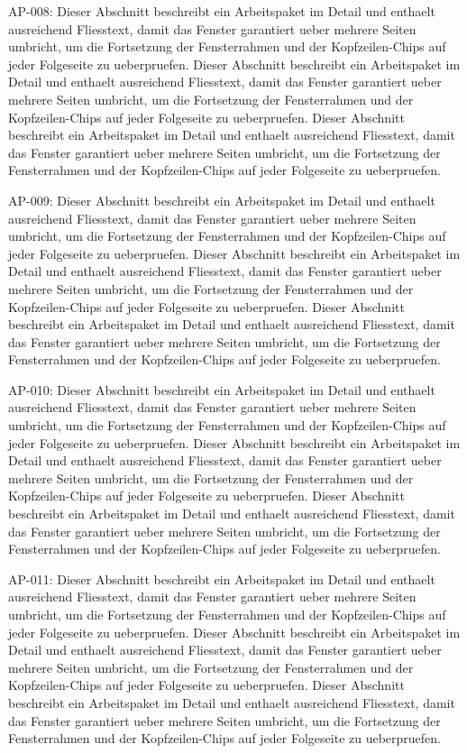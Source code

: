 \documentclass[type=report,theme=light,language=de]{semio}
\begin{document}
\begin{Table}[title=Lange Tabelle]
AP-008: Dieser Abschnitt beschreibt ein Arbeitspaket im Detail und enthaelt ausreichend Fliesstext, damit das Fenster garantiert ueber mehrere Seiten umbricht, um die Fortsetzung der Fensterrahmen und der Kopfzeilen-Chips auf jeder Folgeseite zu ueberpruefen. Dieser Abschnitt beschreibt ein Arbeitspaket im Detail und enthaelt ausreichend Fliesstext, damit das Fenster garantiert ueber mehrere Seiten umbricht, um die Fortsetzung der Fensterrahmen und der Kopfzeilen-Chips auf jeder Folgeseite zu ueberpruefen. Dieser Abschnitt beschreibt ein Arbeitspaket im Detail und enthaelt ausreichend Fliesstext, damit das Fenster garantiert ueber mehrere Seiten umbricht, um die Fortsetzung der Fensterrahmen und der Kopfzeilen-Chips auf jeder Folgeseite zu ueberpruefen. 

AP-009: Dieser Abschnitt beschreibt ein Arbeitspaket im Detail und enthaelt ausreichend Fliesstext, damit das Fenster garantiert ueber mehrere Seiten umbricht, um die Fortsetzung der Fensterrahmen und der Kopfzeilen-Chips auf jeder Folgeseite zu ueberpruefen. Dieser Abschnitt beschreibt ein Arbeitspaket im Detail und enthaelt ausreichend Fliesstext, damit das Fenster garantiert ueber mehrere Seiten umbricht, um die Fortsetzung der Fensterrahmen und der Kopfzeilen-Chips auf jeder Folgeseite zu ueberpruefen. Dieser Abschnitt beschreibt ein Arbeitspaket im Detail und enthaelt ausreichend Fliesstext, damit das Fenster garantiert ueber mehrere Seiten umbricht, um die Fortsetzung der Fensterrahmen und der Kopfzeilen-Chips auf jeder Folgeseite zu ueberpruefen. 

AP-010: Dieser Abschnitt beschreibt ein Arbeitspaket im Detail und enthaelt ausreichend Fliesstext, damit das Fenster garantiert ueber mehrere Seiten umbricht, um die Fortsetzung der Fensterrahmen und der Kopfzeilen-Chips auf jeder Folgeseite zu ueberpruefen. Dieser Abschnitt beschreibt ein Arbeitspaket im Detail und enthaelt ausreichend Fliesstext, damit das Fenster garantiert ueber mehrere Seiten umbricht, um die Fortsetzung der Fensterrahmen und der Kopfzeilen-Chips auf jeder Folgeseite zu ueberpruefen. Dieser Abschnitt beschreibt ein Arbeitspaket im Detail und enthaelt ausreichend Fliesstext, damit das Fenster garantiert ueber mehrere Seiten umbricht, um die Fortsetzung der Fensterrahmen und der Kopfzeilen-Chips auf jeder Folgeseite zu ueberpruefen. 

AP-011: Dieser Abschnitt beschreibt ein Arbeitspaket im Detail und enthaelt ausreichend Fliesstext, damit das Fenster garantiert ueber mehrere Seiten umbricht, um die Fortsetzung der Fensterrahmen und der Kopfzeilen-Chips auf jeder Folgeseite zu ueberpruefen. Dieser Abschnitt beschreibt ein Arbeitspaket im Detail und enthaelt ausreichend Fliesstext, damit das Fenster garantiert ueber mehrere Seiten umbricht, um die Fortsetzung der Fensterrahmen und der Kopfzeilen-Chips auf jeder Folgeseite zu ueberpruefen. Dieser Abschnitt beschreibt ein Arbeitspaket im Detail und enthaelt ausreichend Fliesstext, damit das Fenster garantiert ueber mehrere Seiten umbricht, um die Fortsetzung der Fensterrahmen und der Kopfzeilen-Chips auf jeder Folgeseite zu ueberpruefen. 


\end{Table}
\end{document}
